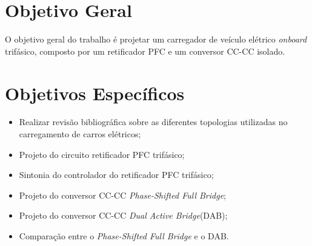 \section{Objetivo Geral}
O objetivo geral do trabalho é projetar um carregador de veículo elétrico \textit{onboard}
trifásico, composto por um retificador PFC e um conversor CC-CC isolado.
\section{Objetivos Específicos}
\begin{itemize}
    \item Realizar revisão bibliográfica sobre as diferentes topologias utilizadas no carregamento de
          carros elétricos;
    \item Projeto do circuito retificador PFC trifásico;
    \item Sintonia do controlador do retificador PFC trifásico;
    \item Projeto do conversor CC-CC \textit{Phase-Shifted Full Bridge};
    \item Projeto do conversor CC-CC \textit{Dual Active Bridge}(DAB);
    \item Comparação entre o \textit{Phase-Shifted Full Bridge} e o DAB.
\end{itemize}